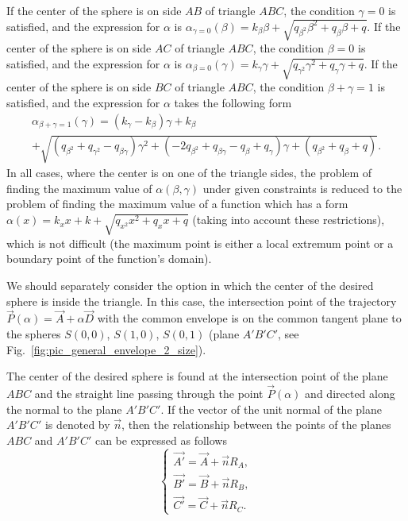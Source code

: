 \documentclass[
11pt,
tightenlines,
twoside,
onecolumn,
nofloats,
nobibnotes,
nofootinbib,
superscriptaddress,
noshowpacs,
centertags]
{revtex4}
\begin{document}
If the center of the sphere is on side $AB$ of triangle  $ABC$, the
condition $\gamma = 0$ is satisfied, and the expression for $\alpha$
is $\alpha_{\gamma = 0}(\beta) = k_{\beta} \beta + \sqrt{q_{\beta^2}
\beta^2 + q_{\beta} \beta + q}$.
If the center of the sphere is on side $AC$ of triangle $ABC$,  the
condition $\beta = 0$ is satisfied, and the expression for $\alpha$
is $\alpha_{\beta = 0}(\gamma) = k_{\gamma} \gamma +
\sqrt{q_{\gamma^2} \gamma^2 + q_{\gamma} \gamma + q}$.
If the center of the sphere is on side $BC$ of triangle $ABC$,  the
condition $\beta + \gamma = 1$ is satisfied, and the expression for
$\alpha$ takes the following form
\begin{multline*}
\alpha_{\beta + \gamma = 1}(\gamma) = (k_{\gamma} - k_{\beta}) \gamma + k_{\beta}  \\
+\sqrt{(q_{\beta^2} + q_{\gamma^2} - q_{\beta \gamma}) \gamma^2 +
(-2 q_{\beta^2} + q_{\beta \gamma} - q_{\beta} + q_{\gamma}) \gamma
+ (q_{\beta^2} + q_{\beta} + q)}.
\end{multline*}
In all cases, where the center is on one of the triangle sides, the
problem of finding the maximum value of $\alpha(\beta, \gamma)$
under given constraints is reduced to the problem of finding the
maximum value of a function which has a form $\alpha(x) = k_x x + k
+ \sqrt {q_{x^2} x^2 + q_x x + q}$ (taking into account these
restrictions), which is not difficult (the maximum point is either a
local extremum point or a boundary point of the function's domain).

We should separately consider the option in which the center of  the
desired sphere is inside the triangle.
In this case, the intersection point of the trajectory
$\vec{P}(\alpha) = \vec{A} + \alpha \vec{D}$ with the common
envelope is on the common tangent plane to the spheres $S(0, 0)$,
$S(1, 0)$, $S(0, 1)$ (plane $A'B'C'$, see
Fig.~\ref{fig:pic_general_envelope_2_size}).

The center of the desired sphere is found at the intersection  point
of the plane $ABC$ and the straight line passing through the point
$\vec{P}(\alpha)$ and directed along the normal to the plane
$A'B'C'$.
If the vector of the unit normal of the plane $A'B'C'$ is  denoted
by $\vec{n}$, then the relationship between the points of the planes
$ABC$ and $A'B'C'$ can be expressed as follows
\begin{equation*}
\begin{cases}
\vec{A'} = \vec{A} + \vec{n} R_A, \\
\vec{B'} = \vec{B} + \vec{n} R_B, \\
\vec{C'} = \vec{C} + \vec{n} R_C.
\end{cases}
\end{equation*}
\end{document}
